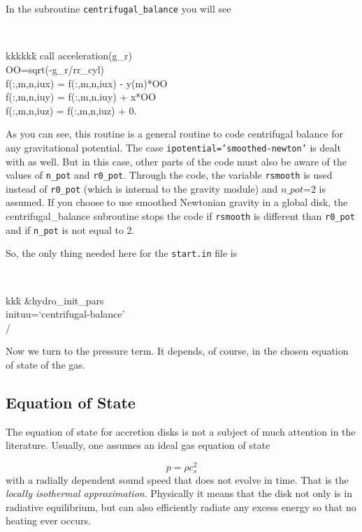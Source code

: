 \documentclass[a4paper,10pt]{article}
\begin{document}
In the subroutine {\tt centrifugal\_balance} you will see

{\tt 
\begin{tabbing}
  kkkkkk\=\kill
        \>  call acceleration(g\_r)\\

        \>  OO=sqrt(-g\_r/rr\_cyl)\\
        \>  f(:,m,n,iux) = f(:,m,n,iux) - y(m)*OO\\
        \>  f(:,m,n,iuy) = f(:,m,n,iuy) + x*OO\\
        \>  f(:,m,n,iuz) = f(:,m,n,iuz) + 0.\\
\end{tabbing}
}

As you can see, this routine is a general routine to code centrifugal balance for any gravitational potential. The case {\tt ipotential='smoothed-newton'} is dealt with as well. But in this case, other parts of the code must also be aware of the values of {\tt n\_pot} and {\tt r0\_pot}. Through the code, the variable {\tt rsmooth} is used instead of {\tt r0\_pot} (which is internal to the gravity module) and $n\_pot$=$2$ is assumed. If you choose to use smoothed Newtonian gravity in a global disk, the centrifugal\_balance subroutine stops the code if {\tt rsmooth} is different than {\tt r0\_pot} and if {\tt n\_pot} is not equal to 2. 

So, the only thing needed here for the {\tt start.in} file is

{\tt
\begin{tabbing}
  kkk\=\kill
\&hydro\_init\_pars\\
  \>inituu=`centrifugal-balance'\\
/
\end{tabbing}
}


Now we turn to the pressure term. It depends, of course, in the chosen equation of state of the gas. 

\subsection{Equation of State}

The equation of state for accretion disks is not a subject of much attention in the literature. Usually, one assumes an ideal gas equation of state 

\begin{equation}
  p=\rho c_s^2
\end{equation}with a radially dependent sound speed that does not evolve in time. That is the {\it locally isothermal approximation}. Physically it means that the disk not only is in radiative equilibrium, but can also efficiently radiate any excess energy so that no heating ever occurs. 
\end{document}
